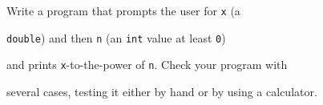 Write a program that prompts the user for \texttt{x} (a

\texttt{double}) and then \texttt{n} (an \texttt{int} value at least \texttt{0})

and prints \texttt{x}-to-the-power of \texttt{n}. Check your program with

several cases, testing it either by hand or by using a calculator.

